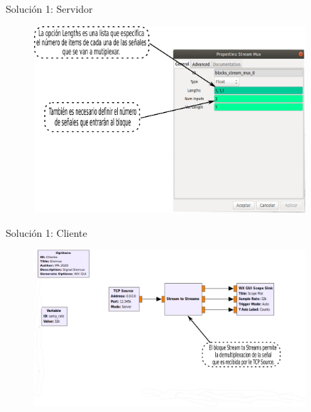 \begin{frame}{Solución 1: Servidor }
\begin{figure}[H]
	\vspace{-3mm}
	\centering
	\includegraphics[width=0.9\textwidth]{soluciones/actividad-1-1/pdf/Actividad1_3.pdf}
\end{figure}
\end{frame}
\begin{frame}{Solución 1: Cliente }
\begin{figure}[H]
	\vspace{-3mm}
	\centering
	\includegraphics[width=0.9\textwidth]{soluciones/actividad-1-1/pdf/Actividad1_4.pdf}
\end{figure}
\end{frame}
